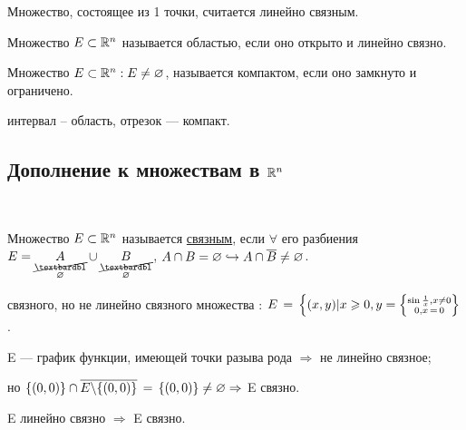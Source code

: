 \Note Множество, состоящее из 1 точки, считается линейно связным.

\todo

\Def Множество $E \subset \mathbb{R}^n$ называется областью, если оно открыто и линейно связно.

\Def Множество $E \subset \mathbb{R}^n : E \neq \varnothing $, называется компактом, если оно замкнуто и ограничено.

\Examples интервал -- область, отрезок --- компакт.

\smallskip

\subsection{Дополнение к множествам в $\mathbb{R}^n$}

 \ \parbox[t]{0.95\linewidth}{\Def Множество $E \subset \mathbb{R}^n$ называется \underline{связным}, если  $\forall$ его разбиения $E=\underset{\substack {\cancel{\textbardbl} \\ \varnothing}}{A} \cup \underset{\substack {\cancel{\textbardbl} \\ \varnothing}}{B}$, $A \cap B = \varnothing \hookrightarrow A \cap \overline{B} \neq \varnothing$.

\Example \parbox[t]{0.95\linewidth}{связного, но не линейно связного множества : $E \,=\, \Big\{ (x,y) | x \geqslant 0, y = \left\{ \substack{\sin{\frac{1}{x}}, x\ne0 \\ 0, x \,=\, 0} \right\}$.

E --- график функции, имеющей точки разыва  рода $\Rightarrow$ не линейно связное;

но $\{(0,0)\} \cap \overline{E \backslash \{(0,0)\}} \,=\, \{(0,0)\} \ne \varnothing \Rightarrow$ E связно.}

\Note E линейно связно $\Rightarrow$ E связно.}


\newpage

